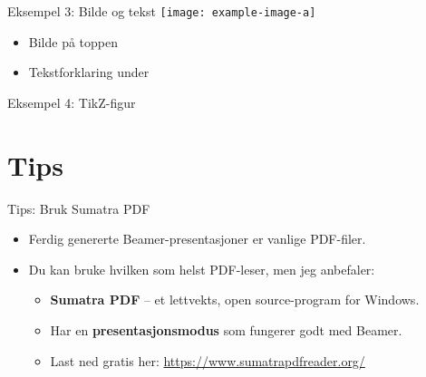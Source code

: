 \documentclass{beamer}
\begin{document}
	\begin{frame}{Eksempel 3: Bilde og tekst}
		\centering
		\texttt{[image: example-image-a]}
		\vspace{0.5cm}
		
		\begin{itemize}
			\item Bilde på toppen
			\item Tekstforklaring under
		\end{itemize}
	\end{frame}
	
	\begin{frame}{Eksempel 4: TikZ-figur}
	\end{frame}
	
\section{Tips}
	
	\begin{frame}{Tips: Bruk Sumatra PDF}
		\begin{itemize}
			\item Ferdig genererte Beamer-presentasjoner er vanlige PDF-filer.
			\item Du kan bruke hvilken som helst PDF-leser, men jeg anbefaler:
			\begin{itemize}
				\item \textbf{Sumatra PDF} – et lettvekts, open source-program for Windows.
				\item Har en \textbf{presentasjonsmodus} som fungerer godt med Beamer.
				\item Last ned gratis her: \url{https://www.sumatrapdfreader.org/}
			\end{itemize}
		\end{itemize}
	\end{frame}
	
\end{document}
